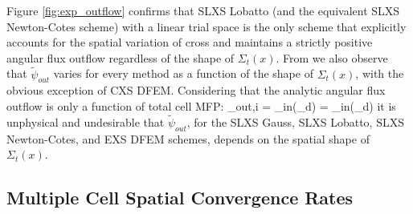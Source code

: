 %
%
%
%
Figure \ref{fig:exp_outflow} confirms that  SLXS Lobatto (and the equivalent SLXS Newton-Cotes scheme) with a linear trial space is the only scheme that explicitly accounts for the spatial variation of cross and maintains a strictly positive angular flux outflow regardless of the shape of $\Sigma_t(x)$.
From  we also observe that $\widetilde{\psi}_{out}$ varies for every method as a function of the shape of $\Sigma_t(x)$, with the obvious exception of CXS DFEM.
Considering that the analytic angular flux outflow is only a function of total cell MFP:
\benum
\label{eq:chap3_outflow_truth}
\psi_{out,i} = \psi_{in}(\mu_d) \exp{} = \psi_{in}(\mu_d) \exp{} \pec
\eenum
it is unphysical and undesirable that $\widetilde{\psi}_{out}$, for the SLXS Gauss, SLXS Lobatto, SLXS Newton-Cotes, and EXS DFEM schemes, depends on the spatial shape of $\Sigma_t(x)$.

\subsection{Multiple Cell Spatial Convergence Rates}

